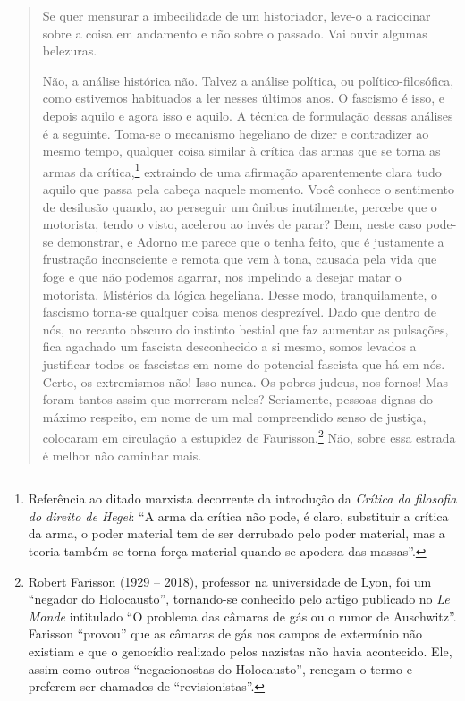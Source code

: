 \begin{quote}
Se quer mensurar a imbecilidade de um historiador, leve-o a raciocinar
sobre a coisa em andamento e não sobre o passado. Vai ouvir algumas
belezuras.

Não, a análise histórica não. Talvez a análise política, ou
político-filosófica, como estivemos habituados a ler nesses últimos
anos. O fascismo é isso, e depois aquilo e agora isso e aquilo. A
técnica de formulação dessas análises é a seguinte. Toma-se o mecanismo
hegeliano de dizer e contradizer ao mesmo tempo, qualquer coisa similar
à crítica das armas que se torna as armas da crítica,\footnote{Referência ao ditado marxista decorrente da introdução da
  \emph{Crítica da filosofia do direito de Hegel}: ``A arma da crítica
  não pode, é claro, substituir a crítica da arma, o poder material tem
  de ser derrubado pelo poder material, mas a teoria também se torna
  força material quando se apodera das massas''.} extraindo de uma afirmação aparentemente clara tudo
aquilo que passa pela cabeça naquele momento. Você conhece o sentimento
de desilusão quando, ao perseguir um ônibus inutilmente, percebe que o
motorista, tendo o visto, acelerou ao invés de parar? Bem, neste caso
pode-se demonstrar, e Adorno me parece que o tenha feito, que é
justamente a frustração inconsciente e remota que vem à tona, causada
pela vida que foge e que não podemos agarrar, nos impelindo a desejar
matar o motorista. Mistérios da lógica hegeliana. Desse modo,
tranquilamente, o fascismo torna-se qualquer coisa menos desprezível.
Dado que dentro de nós, no recanto obscuro do instinto bestial que faz
aumentar as pulsações, fica agachado um fascista desconhecido a si
mesmo, somos levados a justificar todos os fascistas em nome do
potencial fascista que há em nós. Certo, os extremismos não! Isso nunca.
Os pobres judeus, nos fornos! Mas foram tantos assim que morreram neles?
Seriamente, pessoas dignas do máximo respeito, em nome de um mal
compreendido senso de justiça, colocaram em circulação a estupidez de
Faurisson.\footnote{Robert Farisson (1929 -- 2018), professor na universidade de Lyon, foi
  um ``negador do Holocausto'', tornando-se conhecido pelo artigo
  publicado no \emph{Le Monde} intitulado ``O problema das câmaras de
  gás ou o rumor de Auschwitz''. Farisson ``provou'' que as câmaras de
  gás nos campos de extermínio não existiam e que o genocídio realizado
  pelos nazistas não havia acontecido. Ele, assim como outros
  ``negacionostas do Holocausto'', renegam o termo e preferem ser
  chamados de ``revisionistas''.} Não, sobre essa estrada é melhor não caminhar mais.


\end{quote}
